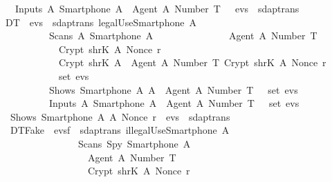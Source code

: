 \begin{isabellebody}
  \ \ \ \ {\isasymLongrightarrow}\ Inputs\ A\ {\isacharparenleft}Smartphone\ A{\isacharparenright}\ {\isasymlbrace}\ Agent\ A{\isacharcomma}\ Number\ T\ {\isasymrbrace}\ {\isacharhash}\ evs{}\ {\isasymin}\ sdaptrans{\isachardoublequoteclose}\isanewline
  \isanewline
  \ \ {\isacharbar}\ DT{}{\isacharcolon}\ {\isachardoublequoteopen}{\isasymlbrakk}\ evs{}\ {\isasymin}\ sdaptrans{\isacharsemicolon}\ legalUse{\isacharparenleft}Smartphone\ A{\isacharparenright}{\isacharsemicolon}\isanewline
  \ \ \ \ \ \ \ \ \ \ \ \ Scans\ A\ {\isacharparenleft}Smartphone\ A{\isacharparenright}\ {\isasymlbrace}\isanewline
  \ \ \ \ \ \ \ \ \ \ \ \ \ \ {\isasymlbrace}Agent\ A{\isacharcomma}\ Number\ T{\isasymrbrace}{\isacharcomma}\isanewline
  \ \ \ \ \ \ \ \ \ \ \ \ \ \ Crypt\ {\isacharparenleft}shrK\ A{\isacharparenright}\ {\isacharparenleft}Nonce\ r{\isacharparenright}{\isacharcomma}\isanewline
  \ \ \ \ \ \ \ \ \ \ \ \ \ \ Crypt\ {\isacharparenleft}shrK\ A{\isacharparenright}\ {\isasymlbrace}\ {\isasymlbrace}Agent\ A{\isacharcomma}\ Number\ T{\isasymrbrace}{\isacharcomma}\ Crypt\ {\isacharparenleft}shrK\ A{\isacharparenright}\ {\isacharparenleft}Nonce\ r{\isacharparenright}\ {\isasymrbrace}\isanewline
  \ \ \ \ \ \ \ \ \ \ \ \ {\isasymrbrace}\ {\isasymin}\ set\ evs{}{\isacharsemicolon}\isanewline
  \ \ \ \ \ \ \ \ \ \ \ \ Shows\ {\isacharparenleft}Smartphone\ A{\isacharparenright}\ A\ {\isasymlbrace}\ Agent\ A{\isacharcomma}\ Number\ T\ {\isasymrbrace}\ {\isasymin}\ set\ evs{}{\isacharsemicolon}\isanewline
  \ \ \ \ \ \ \ \ \ \ \ \ Inputs\ A\ {\isacharparenleft}Smartphone\ A{\isacharparenright}\ {\isasymlbrace}\ Agent\ A{\isacharcomma}\ Number\ T\ {\isasymrbrace}\ {\isasymin}\ set\ evs{}\ {\isasymrbrakk}\isanewline
  \ \ \ {\isasymLongrightarrow}\ Shows\ {\isacharparenleft}Smartphone\ A{\isacharparenright}\ A\ {\isacharparenleft}Nonce\ r{\isacharparenright}\ {\isacharhash}\ evs{}\ {\isasymin}\ sdaptrans{\isachardoublequoteclose}\isanewline
  \isanewline
  \ \ \ {\isacharbar}\ DT{}{\isacharunderscore}Fake{\isacharcolon}\ {\isachardoublequoteopen}{\isasymlbrakk}\ evs{}f\ {\isasymin}\ sdaptrans{\isacharsemicolon}\ illegalUse{\isacharparenleft}Smartphone\ A{\isacharparenright}{\isacharsemicolon}\isanewline
  \ \ \ \ \ \ \ \ \ \ \ \ \ \ \ \ \ \ Scans\ Spy\ {\isacharparenleft}Smartphone\ A{\isacharparenright}\ {\isasymlbrace}\isanewline
  \ \ \ \ \ \ \ \ \ \ \ \ \ \ \ \ \ \ \ \ {\isasymlbrace}Agent\ A{\isacharcomma}\ Number\ T{\isasymrbrace}{\isacharcomma}\isanewline
  \ \ \ \ \ \ \ \ \ \ \ \ \ \ \ \ \ \ \ \ Crypt\ {\isacharparenleft}shrK\ A{\isacharparenright}\ {\isacharparenleft}Nonce\ r{\isacharparenright}{\isacharcomma}\isanewline

\end{isabellebody}
